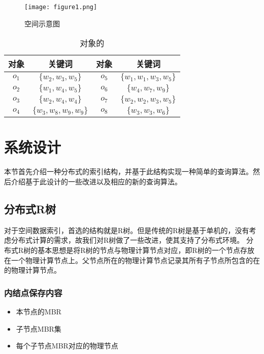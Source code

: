 \documentclass{elegantpaper}
\begin{document}
\begin{figure}[!ht]
	\centering
	\texttt{[image: figure1.png]}
	\caption{空间示意图\label{fig:figure1}}
\end{figure}

\begin{table}[!htbp]
    \small
    \centering
    \caption{对象的}
      \begin{tabular}{cccc}
      对象&关键词&对象&关键词\\
      \hline
      $o_1$   & $\{w_2,w_3,w_5\}$ & $o_5$&$\{w_1,w_1,w_3,w_5\}$\\
      $o_2$   & $\{w_1,w_4,w_5\}$ & $o_6$&$\{w_4,w_7,w_9\}$\\
      $o_3$   & $\{w_2,w_4,w_4\}$ & $o_7$&$\{w_2,w_2,w_3,w_5\}$\\
      $o_4$   & $\{w_3,w_8,w_9,w_9\}$ & $o_8$&$\{w_3,w_3,w_6\}$\\
      \end{tabular}
\end{table}
  







\section{系统设计}

本节首先介绍一种分布式的索引结构，并基于此结构实现一种简单的查询算法。然后介绍基于此设计的一些改进以及相应的新的查询算法。

\subsection{分布式R树}

对于空间数据索引，首选的结构就是R树。但是传统的R树是基于单机的，没有考虑分布式计算的需求，故我们对R树做了一些改进，使其支持了分布式环境。
分布式R树的基本思想是将R树的节点与物理计算节点对应，即R树的一个节点存放在一个物理计算节点上。父节点所在的物理计算节点记录其所有子节点所包含的在的物理计算节点。

\subsubsection{内结点保存内容}

\begin{itemize}

    \item 本节点的MBR

    \item 子节点MBR集

    \item 每个子节点MBR对应的物理节点
    
\end{itemize}
\end{document}
